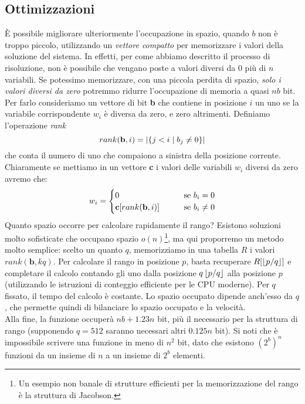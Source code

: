 \subsection{Ottimizzazioni}
È possibile migliorare ulteriormente l'occupazione in spazio, quando $b$ non è troppo piccolo, utilizzando un \textit{vettore compatto} per memorizzare i valori della soluzione del sistema. In effetti, per come abbiamo descritto il processo di risoluzione, non è possibile che vengano poste a valori diversi da 0 più di $n$ variabili. Se potessimo memorizzare, con una piccola perdita di spazio, \textit{solo i valori diversi da zero} potremmo ridurre l'occupazione di memoria a quasi $nb$ bit.\\
Per farlo consideriamo un vettore di bit \textbf{b} che contiene in posizione $i$ un uno se la variabile corrispondente $w_i$ è diversa da zero, e zero altrimenti. Definiamo l'operazione \textit{rank}
\begin{equation*}
    rank(\textbf{b}, i) = |\{j < i \hspace{1mm}|\hspace{1mm} b_j \neq 0\}|
\end{equation*}
che conta il numero di uno che compaiono a sinistra della posizione corrente. Chiaramente se mettiamo in un vettore \textbf{c} i valori delle variabili $w_i$ diversi da zero avremo che:
\begin{equation*}
    w_i =
    \begin{cases}
        0 \hspace{7mm} &\textnormal{se } b_i = 0\\
        \textbf{c}[rank(\textbf{b}, i)] \hspace{7mm} &\textnormal{se } b_i \neq 0\\
    \end{cases}
\end{equation*}
Quanto spazio occorre per calcolare rapidamente il rango? Esistono soluzioni molto sofisticate che occupano spazio $o(n)$\footnote{Un esempio non banale di strutture efficienti per la memorizzazione del rango è la struttura di Jacobson.}, ma qui proporremo un metodo molto semplice: scelto un quanto $q$, memorizziamo in una tabella $R$ i valori $rank(\textbf{b}, kq)$. Per calcolare il rango in posizione $p$, basta recuperare $R[\left\lfloor p / q \right\rfloor]$ e completare il calcolo contando gli uno dalla posizione $q\left\lfloor p / q \right\rfloor$ alla posizione $p$ (utilizzando le istruzioni di conteggio efficiente per le CPU moderne). Per $q$ fissato, il tempo del calcolo è costante. Lo spazio occupato dipende anch'esso da $q$, che permette quindi di bilanciare lo spazio occupato e la velocità.\\
Alla fine, la funzione occuperà $nb + 1.23n$ bit, più il necessario per la struttura di rango (supponendo $q = 512$ saranno necessari altri $0.125n$ bit). Si noti che è impossibile scrivere una funzione in meno di $n^2$ bit, dato che esistono $(2^b)^n$ funzioni da un insieme di $n$ a un insieme di $2^b$ elementi.
